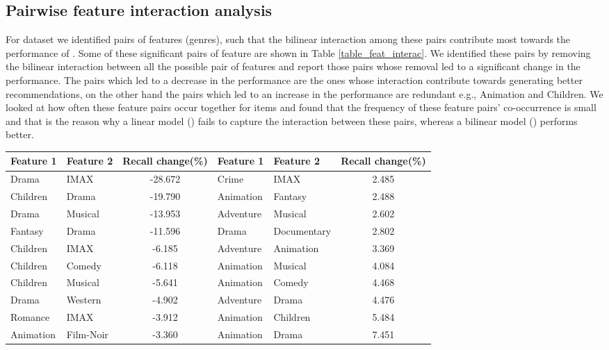 \subsection{Pairwise feature interaction analysis}
For \MLHR dataset we identified pairs of features (genres), such that the bilinear
interaction among these pairs contribute most towards the performance of \CF.
Some of these significant pairs of feature are shown in Table \ref{table_feat_interac}. We
identified these pairs by removing the bilinear interaction between all the possible
pair of features and report those pairs whose removal led to a significant
change in the performance. The pairs which led to a decrease in
the performance are the ones whose interaction contribute towards generating better
recommendations, on the other hand the pairs which led to an increase in the performance are
redundant e.g., Animation and Children. We looked at how often these feature pairs 
occur together for items and found that the frequency of these feature
pairs' co-occurrence is small and that is the reason why a linear model (\CFLIN) fails to capture
the interaction between these pairs, whereas a bilinear model (\CF) performs better.

\begin{table*}[hbt]\footnotesize
  \centering
  \caption {Significant feature pairs}
  \label{table_feat_interac}
  \begin{threeparttable}
    \centering
    \begin{tabular}{p{2cm}p{2cm}cp{2cm}p{2cm}c}
      \hline
       Feature 1 &
       Feature 2 & 
       \multicolumn{1}{p{1.85cm}}{\centering Recall change(\%)} &
       Feature 1 &
       Feature 2 &
       \multicolumn{1}{p{1.85cm}}{\centering Recall change(\%)}\\
      \hline
      Drama & IMAX & -28.672& Crime & IMAX & 2.485\\
      Children & Drama & -19.790  & Animation & Fantasy & 2.488\\
      Drama & Musical & -13.953  & Adventure & Musical & 2.602 \\
      Fantasy & Drama & -11.596 & Drama  & Documentary & 2.802 \\
      Children & IMAX & -6.185 & Adventure & Animation & 3.369 \\
      Children & Comedy & -6.118 & Animation & Musical & 4.084  \\
      Children & Musical & -5.641 & Animation & Comedy & 4.468 \\
      Drama & Western & -4.902 & Adventure & Drama & 4.476 \\
      Romance & IMAX & -3.912 & Animation & Children & 5.484 \\
      Animation & Film-Noir & -3.360 & Animation & Drama & 7.451 \\
      \hline
    \end{tabular}
  \end{threeparttable}
\end{table*}



